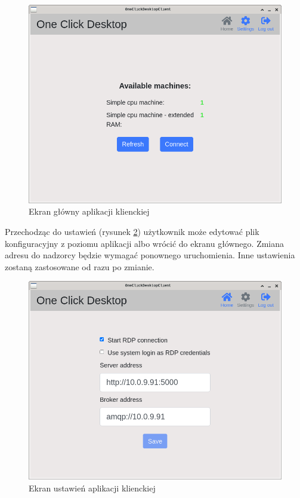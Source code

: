 \documentclass[../opis-rozwiazania.tex]{subfiles}
\begin{document}
\begin{figure}[h!]
  \centering
  \includegraphics[width=\textwidth]{resources/client_home.png}
  \caption{Ekran główny aplikacji klienckiej}
  \label{figure:system_interaction.client.home}
\end{figure}

Przechodząc do ustawień (rysunek \ref{figure:system_interaction.client.settings}) użytkownik może edytować plik konfiguracyjny z poziomu aplikacji albo wrócić do ekranu głównego.
Zmiana adresu do nadzorcy będzie wymagać ponownego uruchomienia.
Inne ustawienia zostaną zastosowane od razu po zmianie.

\begin{figure}[h!]
  \centering
  \includegraphics[width=\textwidth]{resources/client_settings.png}
  \caption{Ekran ustawień aplikacji klienckiej}
  \label{figure:system_interaction.client.settings}
\end{figure}
\end{document}
